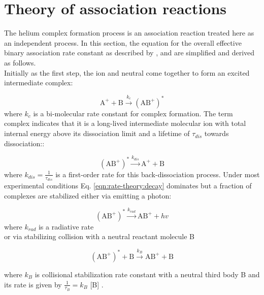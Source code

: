 \section{Theory of association reactions}
\label{subsec:rate-theory}

The helium complex formation process is an association reaction treated here as an independent  process. In this section, the equation for the overall effective binary association rate constant as described by \citet{gerlich_experimental_1992}, and \citet{bates_radiative_1988}  are simplified and derived as follows.\\

Initially as the first step, the ion and neutral come together to form an excited intermediate complex: 

\begin{equation}
    \text{A}^+ + \text{B} \xrightarrow{k_c} (\text{AB}^+) ^*
\end{equation}
where $k_c$ is a bi-molecular rate constant for complex formation. The term complex indicates that it is a long-lived intermediate molecular ion with total internal energy above its dissociation limit and a lifetime of $\tau_{dis}$  towards dissociation::

\begin{equation}
    (\text{AB}^+) ^* \xrightarrow{k_{dis}} \text{A}^+ + \text{B}
    \label{eqn:rate-theory:decay}
\end{equation}
where $k_{dis} = \frac{1}{\tau_{dis}}$ is a first-order rate for this back-dissociation process. Under most experimental conditions Eq. \ref{eqn:rate-theory:decay} dominates but a fraction of complexes are stabilized either via emitting a photon:

\begin{equation}
    (\text{AB}^+) ^* \xrightarrow{k_{rad}} \text{AB}^+ + hv
    \label{eqn:rate-theory:via-hv}
\end{equation}
where $k_{rad}$ is a radiative rate \\

or via stabilizing collision with a neutral reactant molecule B

\begin{equation}
    (\text{AB}^+) ^* + \text{B}\xrightarrow{k_{B}} \text{AB}^+ + \text{B}
    \label{eqn:rate-theory:via-He}
\end{equation}

where $k_{B}$ is collisional stabilization rate constant with a neutral third body B and its rate is given by $\frac{1}{\tau_B} = k_{B}$ [B] .\\


